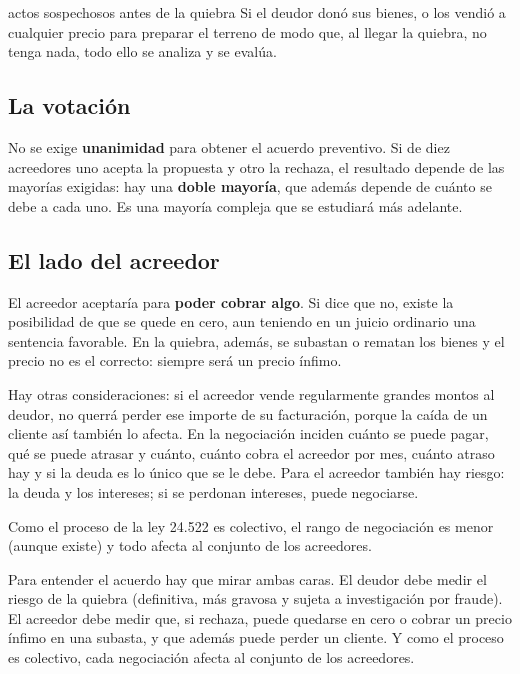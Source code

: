 \documentclass[12pt,oneside]{book}
\begin{document}
\begin{example}{actos sospechosos antes de la quiebra}
Si el deudor donó sus bienes, o los vendió a cualquier precio para preparar el terreno de modo que, al llegar la quiebra, no tenga nada, todo ello se analiza y se evalúa.
\end{example}

\subsection{La votación}

No se exige \textbf{unanimidad} para obtener el acuerdo preventivo. Si de diez acreedores uno acepta la propuesta y otro la rechaza, el resultado depende de las mayorías exigidas: hay una \textbf{doble mayoría}, que además depende de cuánto se debe a cada uno. Es una mayoría compleja que se estudiará más adelante.

\subsection{El lado del acreedor}

El acreedor aceptaría para \textbf{poder cobrar algo}. Si dice que no, existe la posibilidad de que se quede en cero, aun teniendo en un juicio ordinario una sentencia favorable. En la quiebra, además, se subastan o rematan los bienes y el precio no es el correcto: siempre será un precio ínfimo.

Hay otras consideraciones: si el acreedor vende regularmente grandes montos al deudor, no querrá perder ese importe de su facturación, porque la caída de un cliente así también lo afecta. En la negociación inciden cuánto se puede pagar, qué se puede atrasar y cuánto, cuánto cobra el acreedor por mes, cuánto atraso hay y si la deuda es lo único que se le debe. Para el acreedor también hay riesgo: la deuda y los intereses; si se perdonan intereses, puede negociarse.

Como el proceso de la ley 24.522 es colectivo, el rango de negociación es menor (aunque existe) y todo afecta al conjunto de los acreedores.

\begin{important}
Para entender el acuerdo hay que mirar ambas caras. El deudor debe medir el riesgo de la quiebra (definitiva, más gravosa y sujeta a investigación por fraude). El acreedor debe medir que, si rechaza, puede quedarse en cero o cobrar un precio ínfimo en una subasta, y que además puede perder un cliente. Y como el proceso es colectivo, cada negociación afecta al conjunto de los acreedores.
\end{important}
\end{document}
